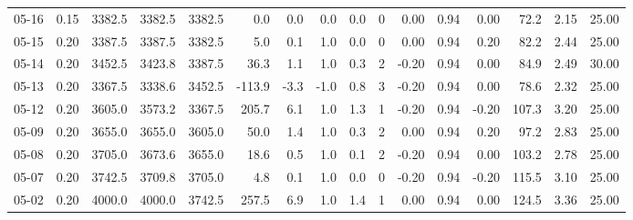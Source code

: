 \begin{threeparttable}
{\begin{tabular}{lrrrrrrrrrrrrrrr}
  05-16 &     0.15 & 3382.5 & 3382.5 & 3382.5 &        0.0 &            0.0 &                      0.0 &                 0.0 &              0 &       0.00 &      0.94 &           0.00 &             72.2 &            2.15 &                  25.00 \\
  05-15 &     0.20 & 3387.5 & 3387.5 & 3382.5 &        5.0 &            0.1 &                      1.0 &                 0.0 &              0 &       0.00 &      0.94 &           0.20 &             82.2 &            2.44 &                  25.00 \\
  05-14 &     0.20 & 3452.5 & 3423.8 & 3387.5 &       36.3 &            1.1 &                      1.0 &                 0.3 &              2 &      -0.20 &      0.94 &           0.00 &             84.9 &            2.49 &                  30.00 \\
  05-13 &     0.20 & 3367.5 & 3338.6 & 3452.5 &     -113.9 &           -3.3 &                     -1.0 &                 0.8 &              3 &      -0.20 &      0.94 &           0.00 &             78.6 &            2.32 &                  25.00 \\
  05-12 &     0.20 & 3605.0 & 3573.2 & 3367.5 &      205.7 &            6.1 &                      1.0 &                 1.3 &              1 &      -0.20 &      0.94 &          -0.20 &            107.3 &            3.20 &                  25.00 \\
  05-09 &     0.20 & 3655.0 & 3655.0 & 3605.0 &       50.0 &            1.4 &                      1.0 &                 0.3 &              2 &       0.00 &      0.94 &           0.20 &             97.2 &            2.83 &                  25.00 \\
  05-08 &     0.20 & 3705.0 & 3673.6 & 3655.0 &       18.6 &            0.5 &                      1.0 &                 0.1 &              2 &      -0.20 &      0.94 &           0.00 &            103.2 &            2.78 &                  25.00 \\
  05-07 &     0.20 & 3742.5 & 3709.8 & 3705.0 &        4.8 &            0.1 &                      1.0 &                 0.0 &              0 &      -0.20 &      0.94 &          -0.20 &            115.5 &            3.10 &                  25.00 \\
  05-02 &     0.20 & 4000.0 & 4000.0 & 3742.5 &      257.5 &            6.9 &                      1.0 &                 1.4 &              1 &       0.00 &      0.94 &           0.00 &            124.5 &            3.36 &                  25.00 \\

\end{tabular}}
\end{threeparttable}
